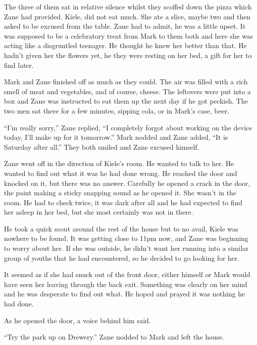\thoughtbreak



The three of them sat in relative silence whilst they scoffed down the pizza which Zane had provided.  Kiele, did not eat much.  She ate a slice, maybe two and then asked to be excused from the table.  Zane had to admit, he was a little upset.  It was supposed to be a celebratory treat from Mark to them both and here she was acting like a disgruntled teenager.  He thought he knew her better than that.  He hadn't given her the flowers yet, he they were resting on her bed, a gift for her to find later.

Mark and Zane finished off as much as they could.  The air was filled with a rich smell of meat and vegetables, and of course, cheese.  The leftovers were put into a box and Zane was instructed to eat them up the next day if he got peckish.  The two men sat there for a few minutes, sipping cola, or in Mark's case, beer.

``I'm really sorry,'' Zane replied, ``I completely forgot about working on the device today, I'll make up for it tomorrow.''  Mark nodded and Zane added, ``It is Saturday after all.''  They both smiled and Zane excused himself.  

Zane went off in the direction of Kiele's room.  He wanted to talk to her.  He wanted to find out what it was he had done wrong.  He reached the door and knocked on it, but there was no answer.  Carefully he opened a crack in the door, the paint making a sticky snapping sound as he opened it.  She wasn't in the room.  He had to check twice, it was dark after all and he had expected to find her asleep in her bed, but she most certainly was not in there.

He took a quick scout around the rest of the house but to no avail, Kiele was nowhere to be found.  It was getting close to 11pm now, and Zane was beginning to worry about her.  If she was outside, he didn't want her running into a similar group of youths that he had encountered, so he decided to go looking for her.

It seemed as if she had snuck out of the front door, either himself or Mark would have seen her leaving through the back exit.  Something was clearly on her mind and he was desperate to find out what.  He hoped and prayed it was nothing he had done.

As he opened the door, a voice behind him said.  

``Try the park up on Drewery.''  Zane nodded to Mark and left the house.




